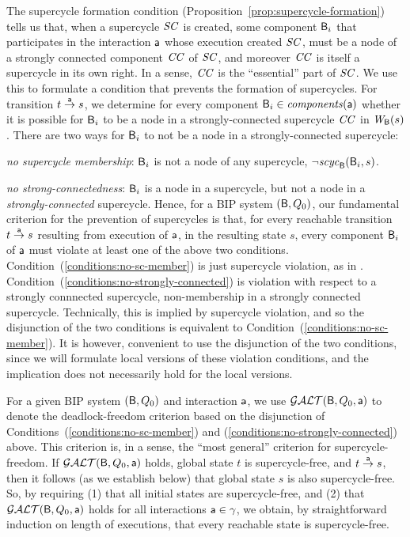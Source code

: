 
The supercycle formation condition (Proposition~\ref{prop:supercycle-formation}) tells us that, when a supercycle $\SC$ is created, some component
$\B_i$ that participates in the interaction $\act$ whose execution created $\SC$, must be a node of a strongly connected component $\CC$ of $\SC$, and
moreover $\CC$ is itself a supercycle in its own right. In a sense, $\CC$ is the ``essential'' part of $\SC$.  We use this to formulate a condition
that prevents the formation of supercycles. For transition $t \goesto[\act] s$, we determine for every component $\B_i \in \cmps{\act}$ whether it is
possible for $\B_i$ to be a node in a strongly-connected supercycle $\CC$ in $\wfg{\B}{s}$.  There are two ways for $\B_i$ to not be a node in a
strongly-connected supercycle: 
%
\bn
\item \label{conditions:no-sc-member}   \textit{no supercycle membership}: $\B_i$ is not a node of any supercycle, \ie $\neg \scyc{\B}{s}{\B_i}$.
\item  \label{conditions:no-strongly-connected} \textit{no strong-connectedness}: $\B_i$ is a node in a supercycle, but not a node in a \emph{strongly-connected} supercycle. 
\en
%
Hence, for a BIP system $(\B, Q_0)$, our fundamental criterion for the prevention of supercycles is that, for every reachable transition
$t \goesto[\act] s$ resulting from execution of $\act$, in the resulting state $s$, every component $\B_i$ of $\act$ must violate at least one of the
above two conditions.  Condition~(\ref{conditions:no-sc-member}) is just supercycle violation, as in .
Condition~(\ref{conditions:no-strongly-connected}) is violation with respect to a strongly connnected supercycle, \ie non-membership in a strongly
connected supercycle. Technically, this is implied by supercycle violation, and so the disjunction of the two conditions is equivalent to 
Condition~(\ref{conditions:no-sc-member}). It is however, convenient to use the disjunction of the two conditions, since
we will formulate local versions of these violation conditions, and the implication does not necessarily hold for the local versions.

For a given BIP system $(\B, Q_0)$ and interaction $\act$, we use $\GAO(\B, Q_0, \act)$ to denote the deadlock-freedom criterion based on the
disjunction of Conditions~(\ref{conditions:no-sc-member}) and (\ref{conditions:no-strongly-connected}) above. 
This criterion is, in a sense, the ``most general'' criterion for supercycle-freedom.
%
If $\GAO(\B, Q_0, \act)$ holds, global state $t$ is supercycle-free, and $t \goesto[\act] s$, then it follows (as we establish below) that global
state $s$ is also supercycle-free.  So, by requiring (1) that all initial states are supercycle-free, and (2) that $\GAO(\B, Q_0, \act)$ holds for all
interactions $\act \in \gamma$, we obtain, by straightforward induction on length of executions, that every reachable state is supercycle-free.

